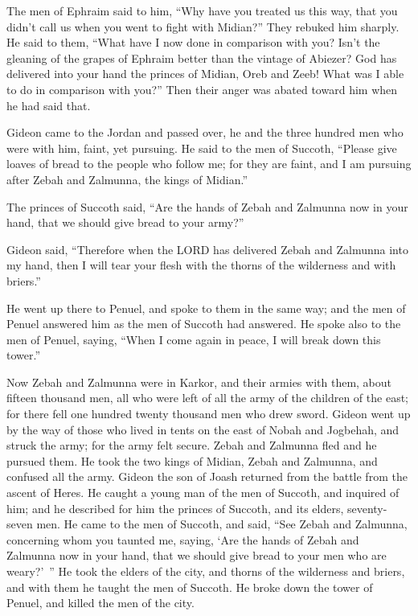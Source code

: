 \mychapter{} \myverse*{}The men of Ephraim said to him, “Why have you treated us this way,
that you didn’t call us when you went to fight with Midian?” They rebuked him sharply.
\myverse{}He said to them, “What have I now done in comparison with you? Isn’t the gleaning
of the grapes of Ephraim better than the vintage of Abiezer?
\myverse{}God has delivered into your hand the princes of Midian, Oreb and Zeeb! What
was I able to do in comparison with you?” Then their anger was abated toward him when he had said that.

\myverse{}Gideon came to the Jordan and passed over, he and the three hundred
men who were with him, faint, yet pursuing.
\myverse{}He said to the men of Succoth, “Please give loaves of bread to the people who
follow me; for they are faint, and I am pursuing after Zebah and Zalmunna, the kings of Midian.”

\myverse{}The princes of Succoth said, “Are the hands of Zebah and Zalmunna
now in your hand, that we should give bread to your army?”

\myverse{}Gideon said, “Therefore when the LORD has delivered Zebah and Zalmunna
into my hand, then I will tear your flesh with the thorns of the wilderness and with briers.”

\myverse{}He went up there to Penuel, and spoke to them in the same way;
and the men of Penuel answered him as the men of Succoth had answered.
\myverse{}He spoke also to the men of Penuel, saying, “When I come again in peace, I will
break down this tower.”

\myverse{}Now Zebah and Zalmunna were in Karkor, and their armies with
them, about fifteen thousand men, all who were left of all the army of the children of the east; for there
fell one hundred twenty thousand men who drew sword.
\myverse{}Gideon went up by the way of those who lived in tents on the east of Nobah
and Jogbehah, and struck the army; for the army felt secure.
\myverse{}Zebah and Zalmunna fled and he pursued them. He took the two kings of Midian,
Zebah and Zalmunna, and confused all the army.
\myverse{}Gideon the son of Joash returned from the battle from the ascent of Heres.
\myverse{}He caught a young man of the men of Succoth, and inquired of him; and he described
for him the princes of Succoth, and its elders, seventy-seven men.
\myverse{}He came to the men of Succoth, and said, “See Zebah and Zalmunna, concerning
whom you taunted me, saying, ‘Are the hands of Zebah and Zalmunna now in your hand, that we should give
bread to your men who are weary?’ ”
\myverse{}He took the elders of the city, and thorns of the wilderness and briers, and
with them he taught the men of Succoth.
\myverse{}He broke down the tower of Penuel, and killed the men of the city.

